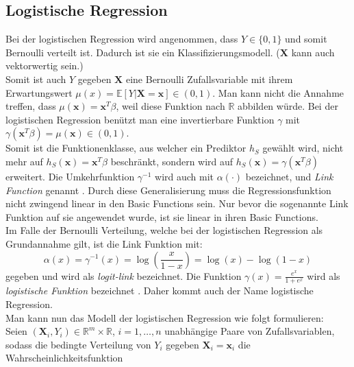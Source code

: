 \subsection{Logistische Regression}
Bei der logistischen Regression wird angenommen, dass $Y \in \{0,1\}$ und somit Bernoulli verteilt ist.
Dadurch ist sie ein Klassifizierungsmodell. ($\mathbf{X}$ kann auch vektorwertig sein.)  \\

Somit ist auch $Y$ gegeben $\mathbf{X}$ eine Bernoulli Zufallsvariable mit ihrem Erwartungswert $\mu(x) = \mathbb{E}[Y|\mathbf{X} = \mathbf{x}] \in (0,1)$. Man kann nicht die Annahme treffen, dass 
$\mu(\mathbf{x}) = \mathbf{x}^T\beta$, weil diese Funktion nach $\mathbb{R}$ abbilden w\"urde. Bei der logistischen Regression ben\"utzt man eine invertierbare Funktion $\gamma$ mit 
$\gamma(\mathbf{x}^T\beta) = \mu(\mathbf{x}) \in (0,1)$. \\

Somit ist die Funktionenklasse, aus welcher ein Prediktor $h_S$ gew\"ahlt wird, nicht mehr auf $h_S(\mathbf{x}) = \mathbf{x}^T\beta$ beschr\"ankt, 
sondern wird auf  $h_S(\mathbf{x}) = \gamma(\mathbf{x}^T\beta)$ erweitert. Die Umkehrfunktion $\gamma^{-1}$ wird auch mit $\alpha(\cdot)$ bezeichnet, 
und \textit{Link Function} genannt \cite[Seite 180]{bishop}. Durch diese Generalisierung muss die Regressionsfunktion nicht zwingend linear in den Basic Functions sein. 
Nur bevor die sogenannte Link Funktion auf sie angewendet wurde, ist sie linear in ihren Basic Functions. \\ 

Im Falle der Bernoulli Verteilung, welche bei der logistischen Regression als Grundannahme gilt, ist die Link Funktion mit:
$$ \alpha(x) = \gamma^{-1}(x) = \log(\frac{x}{1-x}) = \log(x) - \log(1-x) $$
gegeben und wird als \textit{logit-link} bezeichnet. Die Funktion $\gamma(x) = \frac{e^x}{1 + e^x}$ wird als \textit{logistische Funktion} bezeichnet \cite[Seite 223]{wasserman}. 
Daher kommt auch der Name \glqq logistische Regression\grqq{}. \\


Man kann nun das Modell der logistischen Regression wie folgt formulieren: \\
Seien $(\mathbf{X}_i, Y_i) \in \mathbb{R}^m \times \mathbb{R}$, $i = 1, \dots , n$  unabh\"angige Paare von Zufallsvariablen, sodass die bedingte Verteilung von 
$Y_i$ gegeben $\mathbf{X}_i = \mathbf{x}_i$ die Wahrscheinlichkeitsfunktion 

